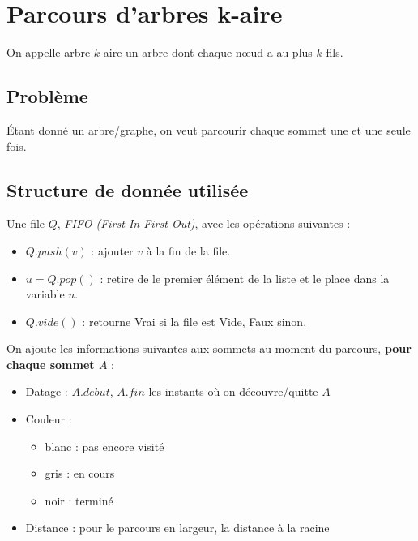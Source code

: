 \chapter{Parcours d'arbres k-aire}

On appelle arbre $k$-aire un arbre dont chaque nœud a au plus $k$ fils.

\section*{Problème}

Étant donné un arbre/graphe, on veut parcourir chaque sommet une et une seule fois.

\section{Structure de donnée utilisée}

Une file $Q$, \textit{FIFO (First In First Out)}, avec les opérations suivantes :

\begin{itemize}
\item \textcolor{ocre}{$Q.push(v)$} : ajouter $v$ à la fin de la file.
\item \textcolor{ocre}{$u = Q.pop()$} : retire de le premier élément de la liste et le place dans la variable $u$.
\item \textcolor{ocre}{$Q.vide()$} : retourne Vrai si la file est Vide, Faux sinon.
\end{itemize}

On ajoute les informations suivantes aux sommets au moment du parcours, \textbf{pour chaque sommet $A$} :

\begin{itemize}
\item \textcolor{ocre}{Datage} : $A.debut$, $A.fin$ les instants où on découvre/quitte $A$
\item \textcolor{ocre}{Couleur} :
	\begin{itemize}
		\item blanc : pas encore visité
		\item gris : en cours
		\item noir : terminé
	\end{itemize}
\item \textcolor{ocre}{Distance} : pour le parcours en largeur, la distance à la racine
\end{itemize}



